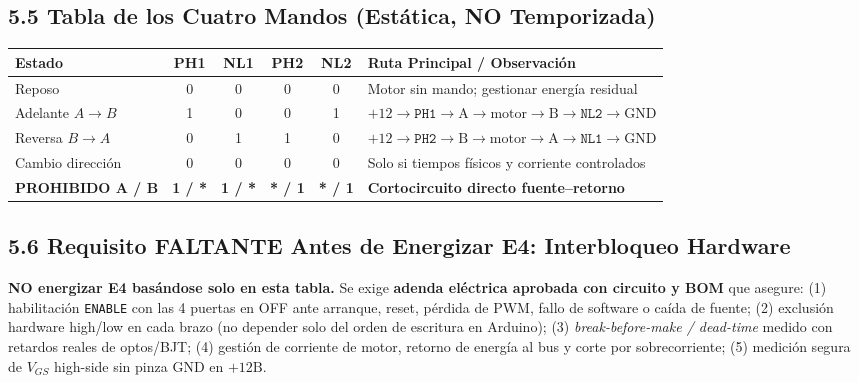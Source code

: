 \documentclass[10pt, a4paper, landscape]{article}
\begin{document}
\begin{minipage}[t]{0.49\linewidth}
\subsection*{5.5 Tabla de los Cuatro Mandos (Estática, NO Temporizada)}
\par\vspace{0.04cm}
{\scriptsize
\renewcommand{\arraystretch}{1.12}%
\noindent\begin{tabularx}{\linewidth}{|l|c|c|c|c|>{\raggedright\arraybackslash}X|}
\hline
\rowcolor{ucbgray}
\textbf{Estado} & \textbf{PH1} & \textbf{NL1} & \textbf{PH2} & \textbf{NL2} & \textbf{Ruta Principal / Observación} \\ \hline
Reposo & 0 & 0 & 0 & 0 & Motor sin mando; gestionar energía residual \\ \hline
Adelante $A\rightarrow B$ & 1 & 0 & 0 & 1 & $+12 \rightarrow \texttt{PH1} \rightarrow \text{A} \rightarrow \text{motor} \rightarrow \text{B} \rightarrow \texttt{NL2} \rightarrow \text{GND}$ \\ \hline
Reversa $B\rightarrow A$ & 0 & 1 & 1 & 0 & $+12 \rightarrow \texttt{PH2} \rightarrow \text{B} \rightarrow \text{motor} \rightarrow \text{A} \rightarrow \texttt{NL1} \rightarrow \text{GND}$ \\ \hline
Cambio dirección & 0 & 0 & 0 & 0 & Solo si tiempos físicos y corriente controlados \\ \hline
\textcolor{warnred}{\textbf{PROHIBIDO A / B}} & \textcolor{warnred}{\textbf{1 / *}} & \textcolor{warnred}{\textbf{1 / *}} & \textcolor{warnred}{\textbf{* / 1}} & \textcolor{warnred}{\textbf{* / 1}} & \textcolor{warnred}{\textbf{Cortocircuito directo fuente--retorno}} \\ \hline
\end{tabularx}\par}

\subsection*{5.6 Requisito FALTANTE Antes de Energizar E4: Interbloqueo Hardware}
{\scriptsize \textbf{\textcolor{warnred}{NO energizar E4 basándose solo en esta tabla.}} Se exige \textbf{adenda eléctrica aprobada con circuito y BOM} que asegure: (1) habilitación \texttt{ENABLE} con las 4 puertas en OFF ante arranque, reset, pérdida de PWM, fallo de software o caída de fuente; (2) exclusión hardware high/low en cada brazo (no depender solo del orden de escritura en Arduino); (3) \textit{break-before-make / dead-time} medido con retardos reales de optos/BJT; (4) gestión de corriente de motor, retorno de energía al bus y corte por sobrecorriente; (5) medición segura de $V_{GS}$ high-side sin pinza GND en $+12\text{B}$.}
\end{minipage}
\end{document}
